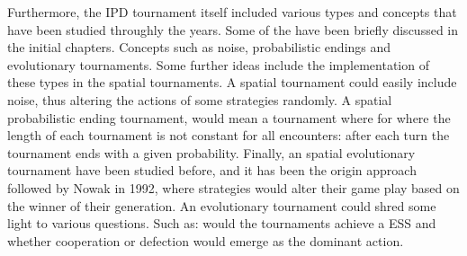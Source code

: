Furthermore, the IPD tournament itself included various types and concepts that
have been studied throughly the years. Some of the have been briefly discussed
in the initial chapters. Concepts such as noise, probabilistic endings and evolutionary
tournaments. Some further ideas include the implementation of these types in the
spatial tournaments. A spatial tournament could easily include noise, thus altering
the actions of some strategies randomly. A spatial probabilistic ending tournament,
would mean a tournament where for where the length of each tournament is not
constant for all encounters: after each turn the tournament ends with a given
probability. Finally, an spatial evolutionary tournament have been studied before,
and it has been the origin approach followed by Nowak in 1992, where strategies
would alter their game play based on the winner of their generation. An evolutionary
tournament could shred some light to various questions. Such as: would the
tournaments achieve a ESS and whether cooperation or defection would emerge as
the dominant action.
